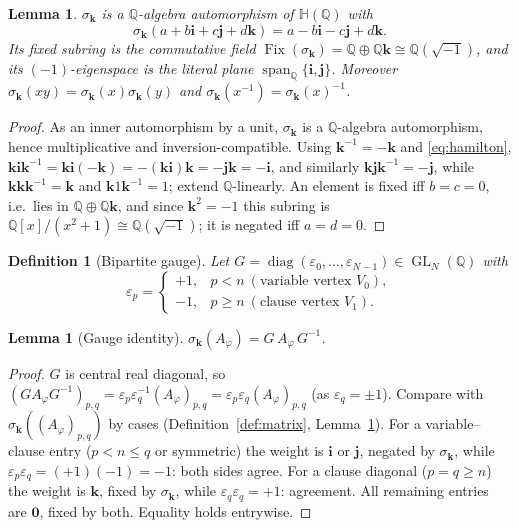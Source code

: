 \documentclass[pdflatex,sn-mathphys-num]{sn-jnl}
\theoremstyle{thmstyleone}%
\newtheorem{lemma}[theorem]{Lemma}%
\theoremstyle{thmstyletwo}%
\theoremstyle{thmstylethree}%
\newtheorem{definition}{Definition}%
\newcommand{\HH}{\mathbb{H}}
\newcommand{\QQ}{\mathbb{Q}}
\newcommand{\Fix}{\operatorname{Fix}}
\newcommand{\bi}{\mathbf{i}}
\newcommand{\bj}{\mathbf{j}}
\newcommand{\bk}{\mathbf{k}}
\newcommand{\Aphi}{A_{\varphi}}
\DeclareMathOperator{\spann}{span}
\DeclareMathOperator{\diag}{diag}
\DeclareMathOperator{\GL}{GL}
\begin{document}
\begin{lemma}\label{lem:sigma}
$\sigma_{\bk}$ is a $\QQ$-algebra automorphism of $\HH(\QQ)$ with
\[
  \sigma_{\bk}(a+b\bi+c\bj+d\bk)=a-b\bi-c\bj+d\bk .
\]
Its fixed subring is the commutative field
$\Fix(\sigma_{\bk})=\QQ\oplus\QQ\bk\cong\QQ(\sqrt{-1})$, and its
$(-1)$-eigenspace is the literal plane $\spann_\QQ\{\bi,\bj\}$. Moreover
$\sigma_{\bk}(xy)=\sigma_{\bk}(x)\sigma_{\bk}(y)$ and
$\sigma_{\bk}(x^{-1})=\sigma_{\bk}(x)^{-1}$.
\end{lemma}

\begin{proof}
As an inner automorphism by a unit, $\sigma_{\bk}$ is a $\QQ$-algebra
automorphism, hence multiplicative and inversion-compatible. Using
$\bk^{-1}=-\bk$ and \eqref{eq:hamilton},
$\bk\bi\bk^{-1}=\bk\bi(-\bk)=-(\bk\bi)\bk=-\bj\bk=-\bi$, and similarly
$\bk\bj\bk^{-1}=-\bj$, while $\bk\bk\bk^{-1}=\bk$ and $\bk1\bk^{-1}=1$;
extend $\QQ$-linearly. An element is fixed iff $b=c=0$, i.e.\ lies in
$\QQ\oplus\QQ\bk$, and since $\bk^2=-1$ this subring is
$\QQ[x]/(x^2+1)\cong\QQ(\sqrt{-1})$; it is negated iff $a=d=0$.
\end{proof}

\begin{definition}[Bipartite gauge]\label{def:gauge}
Let $G=\diag(\varepsilon_0,\dots,\varepsilon_{N-1})\in\GL_N(\QQ)$ with
\[
  \varepsilon_p=\begin{cases}+1,&p<n\ (\text{variable vertex }V_0),\\
  -1,&p\ge n\ (\text{clause vertex }V_1).\end{cases}
\]
\end{definition}

\begin{lemma}[Gauge identity]\label{lem:gauge}
$\sigma_{\bk}(\Aphi)=G\,\Aphi\,G^{-1}$.
\end{lemma}

\begin{proof}
$G$ is central real diagonal, so
$(G\Aphi G^{-1})_{p,q}=\varepsilon_p\varepsilon_q^{-1}(\Aphi)_{p,q}
=\varepsilon_p\varepsilon_q(\Aphi)_{p,q}$ (as $\varepsilon_q=\pm1$). Compare
with $\sigma_{\bk}((\Aphi)_{p,q})$ by cases (Definition~\ref{def:matrix},
Lemma~\ref{lem:sigma}). For a variable--clause entry ($p<n\le q$ or
symmetric) the weight is $\bi$ or $\bj$, negated by $\sigma_{\bk}$, while
$\varepsilon_p\varepsilon_q=(+1)(-1)=-1$: both sides agree. For a clause
diagonal ($p=q\ge n$) the weight is $\bk$, fixed by $\sigma_{\bk}$, while
$\varepsilon_q\varepsilon_q=+1$: agreement. All remaining entries are
$\mathbf0$, fixed by both. Equality holds entrywise.
\end{proof}
\end{document}
